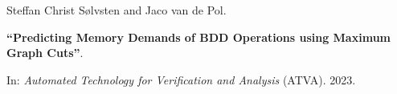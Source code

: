 Steffan Christ Sølvsten and Jaco van de Pol.

{\bf ``Predicting Memory Demands of BDD Operations using Maximum Graph Cuts''}.

In: \emph{Automated Technology for Verification and Analysis} (ATVA).
2023.

\medskip


\label{cite:2023.atva}